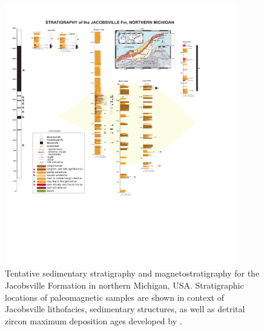 \documentclass[draft]{agujournal2019}
\begin{document}
\begin{figure}[h!]
\centering
\includegraphics[width=0.9\textwidth]{Jacobsville_Sections_v3.pdf}
\caption{Tentative sedimentary stratigraphy and magnetostratigraphy for the Jacobsville Formation in northern Michigan, USA. Stratigraphic locations of paleomagnetic samples are shown in context of Jacobsville lithofacies, sedimentary structures, as well as detrital zircon maximum deposition ages developed by . }
\label{fig:strat_column}
\end{figure}


\end{document}
